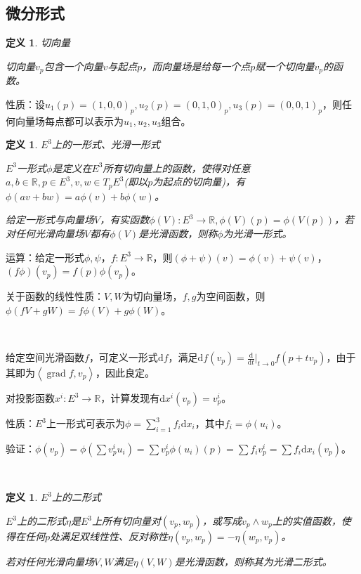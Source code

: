 \documentclass[a4paper,UTF8,fontset=windows]{ctexart}
\DeclareMathOperator{\grad}{grad}
\newtheorem{dfn}[thm]{定义}
\begin{document}
\subsection{微分形式}

\begin{dfn}
切向量

切向量$v_p$包含一个向量$v$与起点$p$，而向量场是给每一个点$p$赋一个切向量$v_p$的函数。
\end{dfn}

性质：设$u_1(p)=(1,0,0)_p,u_2(p)=(0,1,0)_p,u_3(p)=(0,0,1)_p$，则任何向量场每点都可以表示为$u_1,u_2,u_3$组合。

\begin{dfn}
$E^3$上的一形式、光滑一形式
    
$E^3$一形式$\phi$是定义在$E^3$所有切向量上的函数，使得对任意$a,b\in\mathbb{R},p\in E^3,v,w\in T_pE^3$(即以$p$为起点的切向量)，有$\phi(av+bw)=a\phi(v)+b\phi(w)$。

给定一形式与向量场$V$，有实函数$\phi(V):E^3\to\mathbb{R},\phi(V)(p)=\phi(V(p))$，若对任何光滑向量场$V$都有$\phi(V)$是光滑函数，则称$\phi$为光滑一形式。
\end{dfn}

运算：给定一形式$\phi,\psi$，$f:E^3\to\mathbb{R}$，则$(\phi+\psi)(v)=\phi(v)+\psi(v)$，$(f\phi)(v_p)=f(p)\phi(v_p)$。

关于函数的线性性质：$V,W$为切向量场，$f,g$为空间函数，则$\phi(fV+gW)=f\phi(V)+g\phi(W)$。

\

给定空间光滑函数$f$，可定义一形式$\mathrm{d}f$，满足$\mathrm{d}f(v_p)=\frac{\mathrm{d}}{\mathrm{d}t}|_{t\to0}f(p+tv_p)$，由于其即为$\left<\grad f,v_p\right>$，因此良定。

对投影函数$x^i:E^3\to\mathbb{R}$，计算发现有$\mathrm{d}x^i(v_p)=v_p^i$。

性质：$E^3$上一形式可表示为$\phi=\sum_{i=1}^3f_i\mathrm{d}x_i$，其中$f_i=\phi(u_i)$。

验证：$\phi(v_p)=\phi(\sum v_p^iu_i)=\sum v_p^i\phi(u_i)(p)=\sum f_iv_p^i=\sum f_i\mathrm{d}x_i(v_p)$。

\

\begin{dfn} $E^3$上的二形式

$E^3$上的二形式$\eta$是$E^3$上所有切向量对$(v_p,w_p)$，或写成$v_p\wedge w_p$上的实值函数，使得在任何$p$处满足双线性性、反对称性$\eta(v_p,w_p)=-\eta(w_p,v_p)$。

若对任何光滑向量场$V,W$满足$\eta(V,W)$是光滑函数，则称其为光滑二形式。
\end{dfn}
\end{document}
